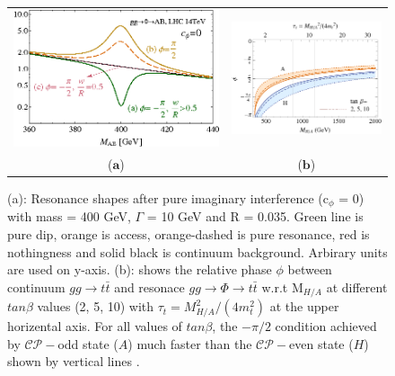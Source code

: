 \begin{figure}[htp]
\centering
\begin{tabular}{cc}
\hspace{-0.3cm}
\includegraphics[scale=0.41]{fig/chapt2/dip_peak_nothing.png}
& \hspace{-0.45cm} \includegraphics[scale=0.61]{fig/chapt2/fig_phase_A_H.png}\\
  \qquad\qquad\qquad ($\mathbf{a}$)\qquad\qquad\qquad\qquad&($\mathbf{b}$) \\
\end{tabular}
\caption{(a): Resonance shapes after pure imaginary interference (c$_{\phi}$ = 0) with mass = 400 GeV, $\Gamma$ = 10 GeV and R = 0.035. Green line is pure dip, orange is access, orange-dashed is pure resonance, red is nothingness and solid black is continuum background. Arbirary units are used on y-axis. (b): shows the relative phase $\phi$ between continuum $gg\rightarrow t\bar{t}$ and resonace $gg\rightarrow \Phi \rightarrow t\bar{t}$ w.r.t M$_{H/A}$ at different $tan\beta$ values (2, 5, 10) with $\tau_{t} = M^{2}_{H/A}/(4m_{t}^{2})$ at the upper horizental axis. For all values of $tan\beta$, the $-\pi/2$ condition achieved by $\mathcal{CP}-$odd state ($A$) much faster than the $\mathcal{CP}-$even state ($H$) shown by vertical lines \cite{Jung:2015gta}. }\label{fig:dip_peak_nothing_H_A}
\end{figure}

